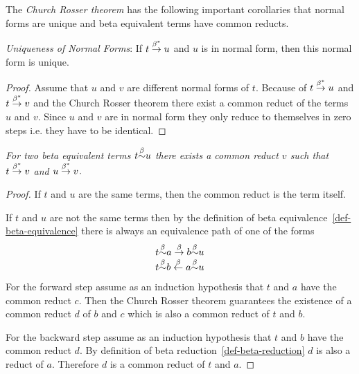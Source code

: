 \documentclass[12pt]{article}
\begin{document}
The \emph{Church Rosser theorem} has the following important corollaries that
normal forms are unique and beta equivalent terms have common reducts.


\begin{corollary}
    \emph{Uniqueness of Normal Forms}:
    \label{thm-normal-form-unique}
    If $t \stackrel{\beta^*}\to u$ and $u$ is in normal form, then this normal form is
    unique.
    \begin{proof}
        Assume that $u$ and $v$ are different normal forms of $t$. Because of $t
        \stackrel{\beta^*}\to u$ and $t \stackrel{\beta^*}\to v$ and the Church Rosser theorem there
        exist a common reduct of the
        terms $u$ and $v$. Since $u$ and $v$ are in normal form they only reduce
        to themselves in zero steps i.e. they have to be identical.
    \end{proof}
\end{corollary}





\begin{corollary}
    \emph{For two beta equivalent terms $t {\stackrel \beta \sim} u$ there exists a common
    reduct $v$ such that $t \stackrel{\beta^*}\to v$ and $u \stackrel{\beta^*}\to v$}.

    \begin{proof}
        If $t$ and $u$ are the same terms, then the common reduct is the term
        itself.

        If $t$ and $u$ are not the same terms then by the definition of beta
        equivalence~\ref{def-beta-equivalence} there is always an
        equivalence path of one of the forms
        $$
        \begin{array}{lllll} 
            t {\stackrel \beta \sim} a \stackrel{\beta}\to b {\stackrel \beta \sim} u 
            \\
            t {\stackrel \beta \sim} b \stackrel{\beta}\leftarrow a {\stackrel \beta \sim} u 
         \end{array}
        $$
        For the forward step assume as an induction hypothesis that $t$ and $a$
        have the common reduct $c$. Then the Church Rosser theorem guarantees the
        existence of a common reduct $d$ of $b$ and $c$ which is also a common
        reduct of $t$ and $b$.

        For the backward step assume as an induction hypothesis that $t$ and $b$
        have the common reduct $d$. By definition of beta
        reduction~\ref{def-beta-reduction} $d$ is also
        a reduct of $a$. Therefore $d$ is a common reduct of $t$ and $a$.
    \end{proof}
\end{corollary}
\end{document}
